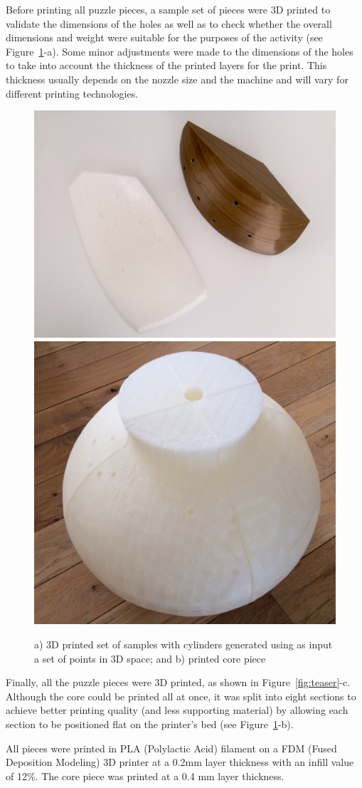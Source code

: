 \documentclass[acmlarge,screen,dvipsnames]{acmart}
\begin{document}
Before printing all puzzle pieces, a sample set of pieces were 3D
printed to validate the dimensions of the holes as well as to check
whether the overall dimensions and weight were suitable for the
purposes of the activity (see Figure~\ref{fig:test}-a). Some minor
adjustments were made to the dimensions of the holes to take into
account the thickness of the printed layers for the print. This
thickness usually depends on the nozzle size and the machine and will
vary for different printing technologies.
%
\begin{figure}[h]
  \centering
  \includegraphics[width=0.45\linewidth]{images/coreANDpiece}
    \includegraphics[width=0.45\linewidth]{images/image1}

  \caption{\label{fig:test}
    a) 3D printed set of samples with cylinders generated
    using as input a set of points in 3D space;
    and b) printed core piece }
\end{figure}

Finally, all the puzzle pieces were 3D printed, as shown in
Figure~\ref{fig:teaser}-c. Although the core could be printed all at
once, it was split into eight sections to achieve better printing
quality (and less supporting material) by allowing each section to be
positioned flat on the printer's bed (see Figure~\ref{fig:test}-b).

All pieces were printed in PLA (Polylactic Acid) filament on a FDM
(Fused Deposition Modeling) 3D printer at a 0.2mm layer thickness with
an infill value of 12\%. The core piece was printed at a 0.4 mm layer
thickness.
\end{document}
